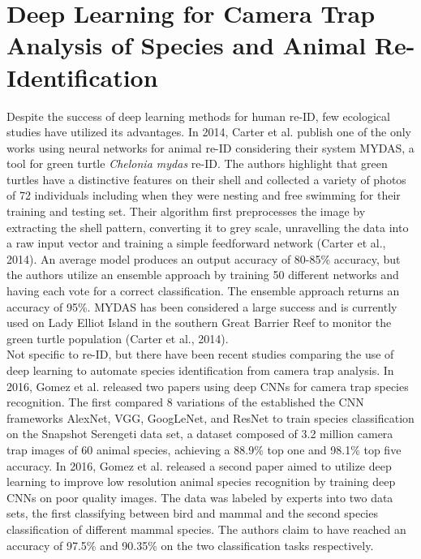 \documentclass[11pt]{article}
\begin{document}
\section*{Deep Learning for Camera Trap Analysis of Species and Animal Re-Identification}

Despite the success of deep learning methods for human re-ID, few ecological studies have utilized its advantages. In 2014, Carter et al. publish one of the only works using neural networks for animal re-ID considering their system MYDAS, a tool for green turtle \textit{Chelonia mydas} re-ID. The authors highlight that green turtles have a distinctive features on their shell and collected a variety of photos of 72 individuals including when they were nesting and free swimming for their training and testing set. Their algorithm first preprocesses the image by extracting the shell pattern, converting it to grey scale, unravelling the data into a raw input vector and training a simple feedforward network (Carter et al., 2014). An average model produces an output accuracy of 80-85\% accuracy, but the authors utilize an ensemble approach by training 50 different networks and having each vote for a correct classification. The ensemble approach returns an accuracy of 95\%. MYDAS has been considered a large success and is currently used on Lady Elliot Island in the southern Great Barrier Reef to monitor the green turtle population (Carter et al., 2014).
\newline
\\
Not specific to re-ID, but there have been recent studies comparing the use of deep learning to automate species identification from camera trap analysis. In 2016, Gomez et al. released two papers using deep CNNs for camera trap species recognition. The first compared 8 variations of the established the CNN frameworks AlexNet, VGG, GoogLeNet, and ResNet to train species classification on the Snapshot Serengeti data set, a dataset composed of 3.2 million camera trap images of 60 animal species, achieving a 88.9\% top one and 98.1\% top five accuracy. In 2016, Gomez et al. released a second paper aimed to utilize deep learning to improve low resolution animal species recognition by training deep CNNs on poor quality images. The data was labeled by experts into two data sets, the first classifying between bird and mammal and the second species classification of different mammal species. The authors claim to have reached an accuracy of 97.5\% and 90.35\% on the two classification tasks respectively. 
\newline
\end{document}
